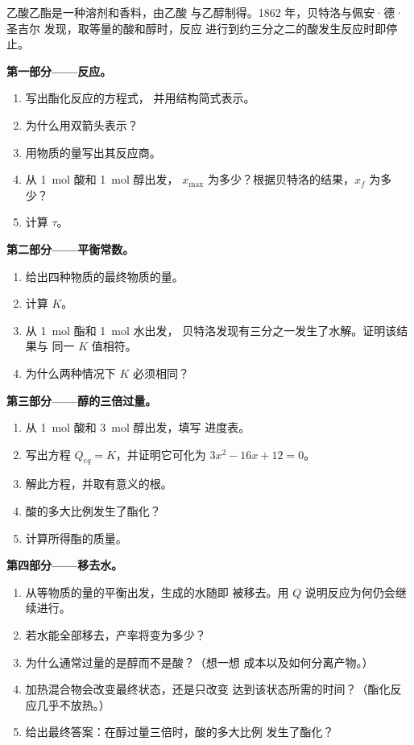 \begin{problem}
\label{pb:g12:equilibrium:1}
乙酸乙酯是一种溶剂和香料，由乙酸
与乙醇制得。1862 年，贝特洛与佩安·德·圣吉尔
发现，取等量的酸和醇时，反应
进行到约三分之二的酸发生反应时即停止。

\medskip
\noindent\textbf{第一部分——反应。}
\begin{enumerate}
  \item 写出酯化反应的方程式，
        并用结构简式表示。
  \item 为什么用双箭头表示？
  \item 用物质的量写出其反应商。
  \item 从 \qty{1}{mol} 酸和 \qty{1}{mol} 醇出发，
        $x_{\max}$ 为多少？根据贝特洛的结果，$x_f$ 为多少？
  \item 计算 $\tau$。
\end{enumerate}

\medskip
\noindent\textbf{第二部分——平衡常数。}
\begin{enumerate}[resume]
  \item 给出四种物质的最终物质的量。
  \item 计算 $K$。
  \item 从 \qty{1}{mol} 酯和 \qty{1}{mol} 水出发，
        贝特洛发现有三分之一发生了水解。证明该结果与
        同一 $K$ 值相符。
  \item 为什么两种情况下 $K$ 必须相同？
\end{enumerate}

\medskip
\noindent\textbf{第三部分——醇的三倍过量。}
\begin{enumerate}[resume]
  \item 从 \qty{1}{mol} 酸和 \qty{3}{mol} 醇出发，填写
        进度表。
  \item 写出方程 $Q_{eq} = K$，并证明它可化为
        $3x^2 - 16x + 12 = 0$。
  \item 解此方程，并取有意义的根。
  \item 酸的多大比例发生了酯化？
  \item 计算所得酯的质量。
\end{enumerate}

\medskip
\noindent\textbf{第四部分——移去水。}
\begin{enumerate}[resume]
  \item 从等物质的量的平衡出发，生成的水随即
        被移去。用 $Q$ 说明反应为何仍会继续进行。
  \item 若水能全部移去，产率将变为多少？
  \item 为什么通常过量的是醇而不是酸？（想一想
        成本以及如何分离产物。）
  \item 加热混合物会改变最终状态，还是只改变
        达到该状态所需的时间？（酯化反应几乎不放热。）
  \item 给出最终答案：在醇过量三倍时，酸的多大比例
        发生了酯化？
\end{enumerate}
\end{problem}
